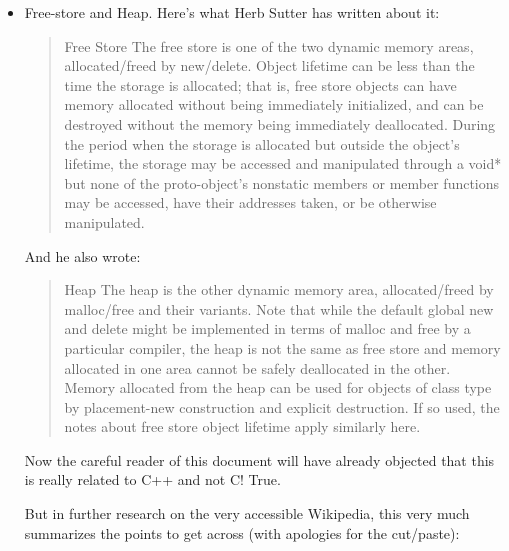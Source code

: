 \documentclass[12pt]{article}
\begin{document}
\begin{enumerate}
\begin{itemize}
\begin{itemize}
\item Free-store and Heap.  Here's what Herb Sutter has written about it:

\begin{quote}
Free Store      The free store is one of the two dynamic memory
                 areas, allocated/freed by new/delete.  Object
                 lifetime can be less than the time the storage
                 is allocated; that is, free store objects can
                 have memory allocated without being immediately
                 initialized, and can be destroyed without the
                 memory being immediately deallocated.  During
                 the period when the storage is allocated but
                 outside the object's lifetime, the storage may
                 be accessed and manipulated through a void* but
                 none of the proto-object's nonstatic members or
                 member functions may be accessed, have their
                 addresses taken, or be otherwise manipulated.
\end{quote}

And he also wrote:

\begin{quote}
 Heap            The heap is the other dynamic memory area,
                 allocated/freed by malloc/free and their
                 variants.  Note that while the default global
                 new and delete might be implemented in terms of
                 malloc and free by a particular compiler, the
                 heap is not the same as free store and memory
                 allocated in one area cannot be safely
                 deallocated in the other. Memory allocated from
                 the heap can be used for objects of class type
                 by placement-new construction and explicit
                 destruction.  If so used, the notes about free
                 store object lifetime apply similarly here.
\end{quote}


Now the careful reader of this document will have already objected that this is really
related to C++ and not C!   True.  

But in further research on the very accessible Wikipedia, this very much summarizes the 
points to get across (with apologies for the cut/paste):


\end{itemize}
\end{itemize}
\end{enumerate}
\end{document}
